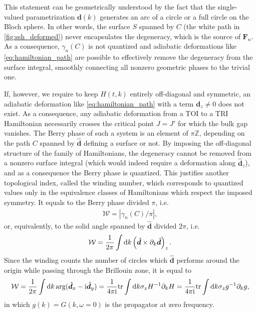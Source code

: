 This statement can be geometrically understood by the fact that the single-valued parametrization $\bm d(k)$ generates an arc of a circle or a full circle on the Bloch sphere.
In other words, the surface $S$ spanned by $C$ (the white path in \cref{fig:ssh_deformed}) never encapsulates the degeneracy, which is the source of ${\bm F}_n$.
As a consequence, $\gamma_n(C)$ is not quantized and adiabatic deformations like \cref{eq:hamiltonian_path} are possible to effectively remove the degeneracy from the surface integral, smoothly connecting all nonzero geometric phases to the trivial one.

If, however, we require to keep $H(t,k)$ entirely off-diagonal and symmetric, an adiabatic deformation like \cref{eq:hamiltonian_path} with a term $\bm d_z\neq0$ does not exist.
As a consequence, any adiabatic deformation from a TOI to a TRI Hamiltonian necessarily crosses the critical point $J=J'$ for which the bulk gap vanishes.
The Berry phase of such a system is an element of $\pi\mathds Z$, depending on the path $C$ spanned by $\hat{\bm d}$ defining a surface or not.
By imposing the off-diagonal structure of the family of Hamiltonians, the degeneracy cannot be removed from a nonzero surface integral (which would indeed require a deformation along $\hat {\bm d}_z$), and as a consequence the Berry phase is quantized.
This justifies another topological index, called the winding number, which corresponds to quantized values only in the equivalence classes of Hamiltonians which respect the imposed symmetry.
It equals to the Berry phase divided $\pi$, i.e.
\begin{align}
    \mathcal W = |\gamma_n(C)/\pi|,
\end{align}
or, equivalently, to the solid angle spanned by $\hat{\bm d}$ divided $2\pi$, i.e.
\begin{align}
    \mathcal W = \frac1{2\pi}\int\mathrm d k\left( \hat{\bm d}\times\partial_k\hat{\bm d} \right)_z.
\end{align}
Since the winding counts the number of circles which $\hat{\bm d}$ performs around the origin while passing through the Brillouin zone, it is equal to
\begin{align}
    \mathcal W = \frac{1}{2\pi}\int\mathrm d k \arg(\hat{\bm d}_x - \mathrm i \hat{\bm d}_y)
    =
    \frac{1}{4\pi\mathrm i} {\rm tr}\int\mathrm d k \sigma_z H^{-1}\partial_k H
    =
    \frac{1}{4\pi\mathrm i} {\rm tr}\int\mathrm d k \sigma_z g^{-1}\partial_k g,
\end{align}
in which $g(k)=G(k,\omega=0)$ is the propagator at zero frequency.

